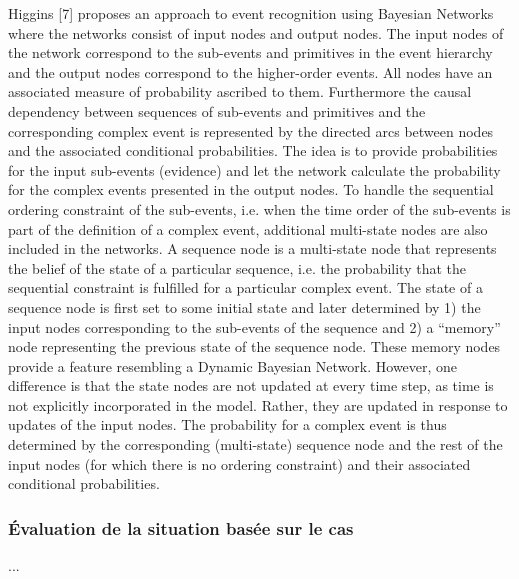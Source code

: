 \documentclass[a4paper,11pt,twoside]{StyleThese}
\begin{document}
Higgins [7] proposes an approach to event recognition using Bayesian Networks where the
networks consist of input nodes and output nodes. The input nodes of the network
correspond to the sub-events and primitives in the event hierarchy and the output nodes
correspond to the higher-order events. All nodes have an associated measure of probability
ascribed to them. Furthermore the causal dependency between sequences of sub-events and
primitives and the corresponding complex event is represented by the directed arcs between
nodes and the associated conditional probabilities. The idea is to provide probabilities for the
input sub-events (evidence) and let the network calculate the probability for the complex
events presented in the output nodes.
To handle the sequential ordering constraint of the sub-events, i.e. when the time order of the
sub-events is part of the definition of a complex event, additional multi-state nodes are also
included in the networks. A sequence node is a multi-state node that represents the belief of
the state of a particular sequence, i.e. the probability that the sequential constraint is fulfilled
for a particular complex event. The state of a sequence node is first set to some initial state
and later determined by 1) the input nodes corresponding to the sub-events of the sequence
and 2) a “memory” node representing the previous state of the sequence node. These
memory nodes provide a feature resembling a Dynamic Bayesian Network. However, one
difference is that the state nodes are not updated at every time step, as time is not explicitly
incorporated in the model. Rather, they are updated in response to updates of the input
nodes.
The probability for a complex event is thus determined by the corresponding (multi-state)
sequence node and the rest of the input nodes (for which there is no ordering constraint) and
their associated conditional probabilities. 


\subsubsection{Évaluation de la situation basée sur le cas}
...
\end{document}
